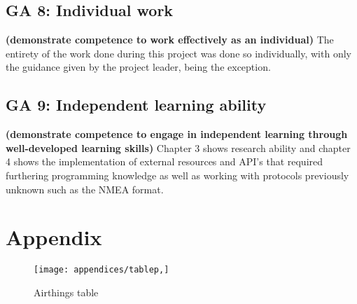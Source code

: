 \section{GA 8: Individual work}
\textbf{(demonstrate competence to work effectively as an individual) }
The entirety of the work done during this project was done so individually, with only the guidance
given by the project leader, being the exception.
\section{GA 9: Independent learning ability}
\textbf{(demonstrate competence to engage in independent learning through well-developed learning skills)  }
Chapter 3 shows research ability and chapter 4 shows the implementation of external resources and API's that required furthering programming knowledge as well as working with protocols previously unknown such as the NMEA format.


\chapter{Appendix}
\makeatletter{}\makeatother

\begin{figure}[!htb]
	\centering
	\texttt{[image: appendices/tablep,]}
	\caption{Airthings table}
	\label{fig:airthingstableappc}
\end{figure}
